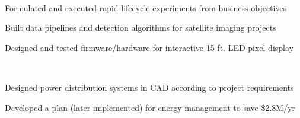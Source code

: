 \documentclass[]{deedy-resume-openfont}
\begin{document}
\begin{minipage}[t]{0.68\textwidth}
\\
\vspace{\topsep}
\vspace{-4mm}
\begin{tightemize}
\item Formulated and executed rapid lifecycle experiments from business objectives
\item Built data pipelines and detection algorithms for satellite imaging projects
\item Designed and tested firmware/hardware for interactive 15 ft. LED pixel display
\end{tightemize}
\sectionsep

\\
\vspace{\topsep}
\vspace{-4mm}
\begin{tightemize}
\item Designed power distribution systems in CAD according to project requirements
\item Developed a plan (later implemented) for energy management to save \$2.8M/yr
\end{tightemize}
\sectionsep



\end{minipage}
\end{document}
